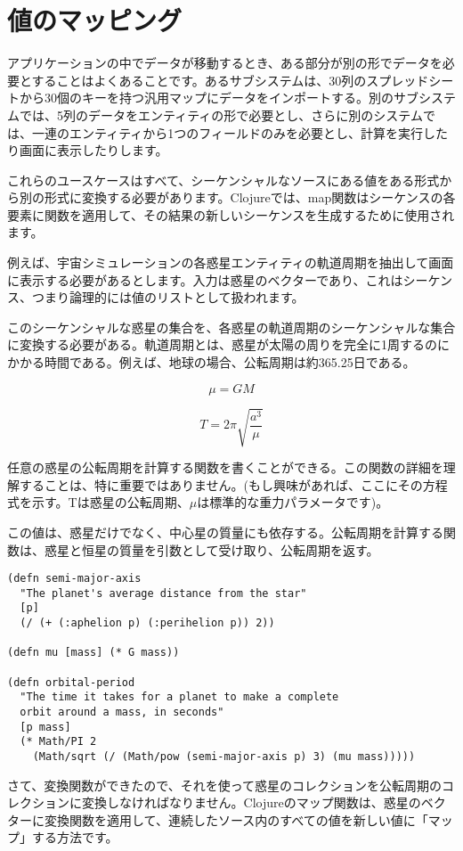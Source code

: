 \section{値のマッピング}

アプリケーションの中でデータが移動するとき、ある部分が別の形でデータを必要とすることはよくあることです。あるサブシステムは、30列のスプレッドシートから30個のキーを持つ汎用マップにデータをインポートする。別のサブシステムでは、5列のデータをエンティティの形で必要とし、さらに別のシステムでは、一連のエンティティから1つのフィールドのみを必要とし、計算を実行したり画面に表示したりします。

これらのユースケースはすべて、シーケンシャルなソースにある値をある形式から別の形式に変換する必要があります。Clojureでは、map関数はシーケンスの各要素に関数を適用して、その結果の新しいシーケンスを生成するために使用されます。

例えば、宇宙シミュレーションの各惑星エンティティの軌道周期を抽出して画面に表示する必要があるとします。入力は惑星のベクターであり、これはシーケンス、つまり論理的には値のリストとして扱われます。

このシーケンシャルな惑星の集合を、各惑星の軌道周期のシーケンシャルな集合に変換する必要がある。軌道周期とは、惑星が太陽の周りを完全に1周するのにかかる時間である。例えば、地球の場合、公転周期は約365.25日である。

$$
\mu = GM
$$

$$
T = 2 \pi \sqrt{\frac{a^3}{\mu}}
$$

任意の惑星の公転周期を計算する関数を書くことができる。この関数の詳細を理解することは、特に重要ではありません。(もし興味があれば、ここにその方程式を示す。Tは惑星の公転周期、$μ$は標準的な重力パラメータです)。

この値は、惑星だけでなく、中心星の質量にも依存する。公転周期を計算する関数は、惑星と恒星の質量を引数として受け取り、公転周期を返す。



\begin{lstlisting}[numbers=none]
(defn semi-major-axis
  "The planet's average distance from the star"
  [p]
  (/ (+ (:aphelion p) (:perihelion p)) 2))

(defn mu [mass] (* G mass))

(defn orbital-period
  "The time it takes for a planet to make a complete
  orbit around a mass, in seconds"
  [p mass]
  (* Math/PI 2
    (Math/sqrt (/ (Math/pow (semi-major-axis p) 3) (mu mass)))))
\end{lstlisting}

さて、変換関数ができたので、それを使って惑星のコレクションを公転周期のコレクションに変換しなければなりません。Clojureのマップ関数は、惑星のベクターに変換関数を適用して、連続したソース内のすべての値を新しい値に「マップ」する方法です。

